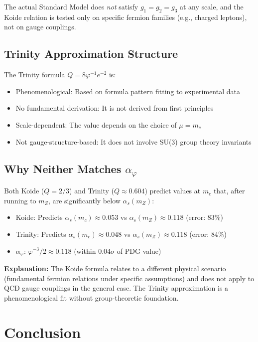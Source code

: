 \documentclass{article}
\begin{document}
\begin{table}[h]
\begin{table}[h]
The actual Standard Model does \emph{not} satisfy $g_1 = g_2 = g_3$ at any scale, and the Koide relation is tested only on specific fermion families (e.g., charged leptons), not on gauge couplings.

\subsection{Trinity Approximation Structure}

The Trinity formula $Q = 8\varphi^{-1}e^{-2}$ is:

\begin{itemize}
  \item Phenomenological: Based on formula pattern fitting to experimental data
  \item No fundamental derivation: It is not derived from first principles
  \item Scale-dependent: The value depends on the choice of $\mu = m_c$
  \item Not gauge-structure-based: It does not involve SU(3) group theory invariants
\end{itemize}

\subsection{Why Neither Matches $\alpha_\varphi$}

Both Koide ($Q = 2/3$) and Trinity ($Q \approx 0.604$) predict values at $m_c$ that, after running to $m_Z$, are significantly below $\alpha_s(m_Z)$:

\begin{itemize}
  \item Koide: Predicts $\alpha_s(m_c) \approx 0.053$ vs $\alpha_s(m_Z) \approx 0.118$ (error: $83\%$)
  \item Trinity: Predicts $\alpha_s(m_c) \approx 0.048$ vs $\alpha_s(m_Z) \approx 0.118$ (error: $84\%$)
  \item $\alpha_\varphi$: $\varphi^{-3}/2 \approx 0.118$ (within $0.04\sigma$ of PDG value)
\end{itemize}

\textbf{Explanation:} The Koide formula relates to a different physical scenario (fundamental fermion relations under specific assumptions) and does not apply to QCD gauge couplings in the general case. The Trinity approximation is a phenomenological fit without group-theoretic foundation.

\section{Conclusion}


\end{table}
\end{table}
\end{document}
